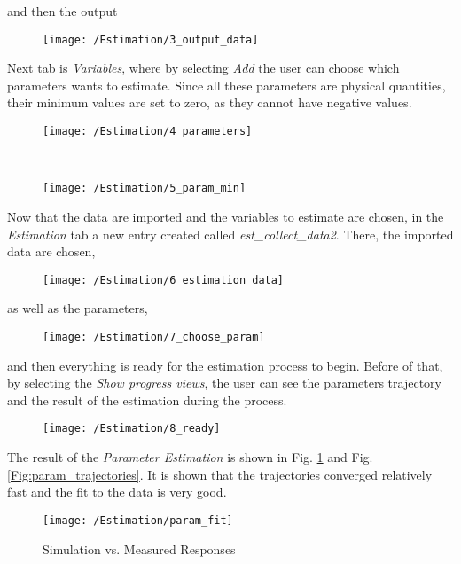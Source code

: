 \noindent and then the output

\begin{figure}[H]
	\texttt{[image: /Estimation/3\_output\_data]}
\end{figure}


\noindent Next tab is \textit{Variables}, where by selecting \textit{Add} the user can choose which parameters wants to estimate. Since all these parameters are physical quantities, their minimum values are set to zero, as they cannot have negative values.

\begin{figure}[H]
	\texttt{[image: /Estimation/4\_parameters]}
\end{figure}

\

\begin{figure}[H]
	\texttt{[image: /Estimation/5\_param\_min]}
\end{figure}

\noindent Now that the data are imported and the variables to estimate are chosen, in the \textit{Estimation} tab a new entry created called \textit{est\_collect\_data2}. There, the imported data are chosen,

\begin{figure}[H]
	\texttt{[image: /Estimation/6\_estimation\_data]}
\end{figure}

\noindent as well as the parameters,

\begin{figure}[H]
	\texttt{[image: /Estimation/7\_choose\_param]}
\end{figure}

\noindent and then everything is ready for the estimation process to begin. Before of that, by selecting the \textit{Show progress views}, the user can see the parameters trajectory and the result of the estimation during the process.

\begin{figure}[H]
	\texttt{[image: /Estimation/8\_ready]}
\end{figure}


The result of the \textit{Parameter Estimation} is shown in Fig. \ref{Fig:param_fit} and Fig. \ref{Fig:param_trajectories}. It is shown that the trajectories converged relatively fast and the fit to the data is very good.

\begin{figure}[H]
	\texttt{[image: /Estimation/param\_fit]}
	\caption{Simulation vs. Measured Responses}
	\label{Fig:param_fit}
\end{figure}

